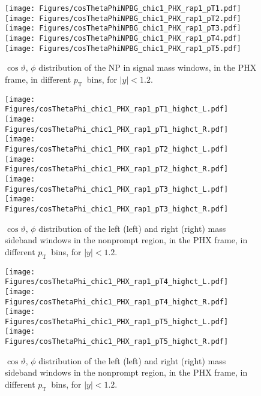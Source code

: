\documentclass[12pt]{article}
\newcommand{\pt}{$p_{\mathrm{T}}$}
\begin{document}
\begin{figure}[htbp]
\centering
\texttt{[image: Figures/cosThetaPhiNPBG\_chic1\_PHX\_rap1\_pT1.pdf]}
\texttt{[image: Figures/cosThetaPhiNPBG\_chic1\_PHX\_rap1\_pT2.pdf]}
\texttt{[image: Figures/cosThetaPhiNPBG\_chic1\_PHX\_rap1\_pT3.pdf]}
\texttt{[image: Figures/cosThetaPhiNPBG\_chic1\_PHX\_rap1\_pT4.pdf]}
\texttt{[image: Figures/cosThetaPhiNPBG\_chic1\_PHX\_rap1\_pT5.pdf]}
\caption{$\cos\vartheta,\,\phi$ distribution of the NP in signal mass
  windows, in the PHX frame, in different \pt\ bins, for $|y| < 1.2$.}
\end{figure}
\clearpage

\begin{figure}[htbp]
\centering
\texttt{[image: Figures/cosThetaPhi\_chic1\_PHX\_rap1\_pT1\_highct\_L.pdf]}
\texttt{[image: Figures/cosThetaPhi\_chic1\_PHX\_rap1\_pT1\_highct\_R.pdf]}
\texttt{[image: Figures/cosThetaPhi\_chic1\_PHX\_rap1\_pT2\_highct\_L.pdf]}
\texttt{[image: Figures/cosThetaPhi\_chic1\_PHX\_rap1\_pT2\_highct\_R.pdf]}
\texttt{[image: Figures/cosThetaPhi\_chic1\_PHX\_rap1\_pT3\_highct\_L.pdf]}
\texttt{[image: Figures/cosThetaPhi\_chic1\_PHX\_rap1\_pT3\_highct\_R.pdf]}
\caption{$\cos\vartheta,\,\phi$ distribution of the left (left) and
  right (right) mass sideband windows in the nonprompt region, in the PHX frame, in different
  \pt\ bins, for $|y| < 1.2$.}
\end{figure}
\clearpage

\begin{figure}[htbp]
\centering
\texttt{[image: Figures/cosThetaPhi\_chic1\_PHX\_rap1\_pT4\_highct\_L.pdf]}
\texttt{[image: Figures/cosThetaPhi\_chic1\_PHX\_rap1\_pT4\_highct\_R.pdf]}
\texttt{[image: Figures/cosThetaPhi\_chic1\_PHX\_rap1\_pT5\_highct\_L.pdf]}
\texttt{[image: Figures/cosThetaPhi\_chic1\_PHX\_rap1\_pT5\_highct\_R.pdf]}
\caption{$\cos\vartheta,\,\phi$ distribution of the left (left) and
  right (right) mass sideband windows in the nonprompt region, in the PHX frame, in different
  \pt\ bins, for $|y| < 1.2$.}
\end{figure}
\clearpage
\end{document}
